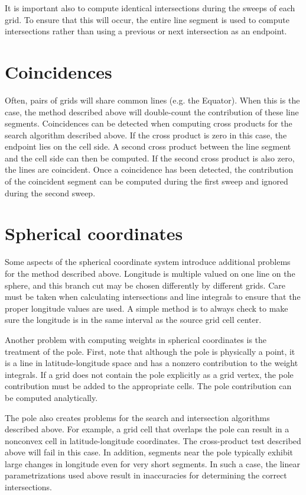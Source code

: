 \documentclass[12pt]{report}
\begin{document}
It is important also to compute identical intersections
during the sweeps of each grid.  To ensure that this
will occur, the entire line segment is used to
compute intersections rather than using a previous or
next intersection as an endpoint.

\section{Coincidences}

Often, pairs of grids will share common lines (e.g. the
Equator).  When this is the case, the method described
above will double-count the contribution of these line
segments.  Coincidences can be detected when computing
cross products for the search algorithm described above.
If the cross product is zero
in this case, the endpoint lies on the cell side.  A
second cross product between the line segment and the
cell side can then be computed.  If the second cross
product is also zero, the lines are coincident.
Once a coincidence has been detected, the contribution
of the coincident segment can be computed during the
first sweep and ignored during the second sweep.

\section{Spherical coordinates}\label{sec-sphere}

Some aspects of the spherical coordinate system introduce
additional problems for the method described above.
Longitude is multiple valued on one line on the sphere,
and this branch cut may be chosen differently by different
grids.  Care must be taken when calculating intersections
and line integrals to ensure that the proper
longitude values are used.  A simple method is to always
check to make sure the longitude is in the same interval
as the source grid cell center.

Another problem with computing weights in spherical
coordinates is the treatment of the pole.  First, note
that although the pole is physically a point, it is a
line in latitude-longitude space and has a nonzero
contribution to the weight integrals.  If a grid does
not contain the pole explicitly as a grid vertex, the
pole contribution must be added to the appropriate cells.
The pole contribution can be computed analytically.

The pole also creates problems for the search and
intersection algorithms described above.  For example,
a grid cell that overlaps the pole can result in a
nonconvex cell in latitude-longitude coordinates.
The cross-product test described above
will fail in this case.  In addition, segments near
the pole typically exhibit large changes in longitude
even for very short segments.  In such a case, the
linear parametrizations used above
result in inaccuracies for determining the correct
intersections.
\end{document}
